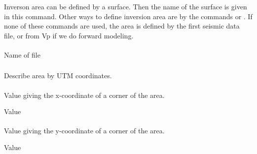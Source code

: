 \subsubsection{}
 \slist
   \item \Description Inverson area can be defined by a surface. Then the name of the surface is given in this command. Other ways to define inversion area are by the commands  or . If none of these commands are used, the area is defined by the first seismic data file, or from Vp if we do forward modeling.
   \item \Argument 
   \item \Default
 \elist
\paragraph{}
\slist
   \item \Description 
   \item \Argument Name of file
   \item \Default
 \elist

\subsubsection{}
 \slist
   \item \Description Describe area by UTM coordinates.
   \item \Argument 
   \item \Default
 \elist


\paragraph{}
 \slist
   \item \Description Value giving the x-coordinate of a corner of the area.
   \item \Argument Value
   \item \Default
 \elist

\paragraph{}
 \slist
   \item \Description Value giving the y-coordinate of a corner of the area.
   \item \Argument Value
   \item \Default
 \elist

